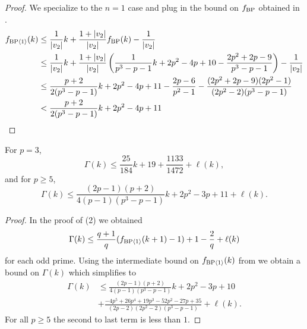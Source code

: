 \begin{proof}
  We specialize  to the $n=1$ case and plug in the bound on $f_{\mathrm{BP}}$ obtained in .
  \begin{align}\label{eqn:bp1}
    \nonumber f_{\textup{BP}\langle 1 \rangle}(k)
    &\leq \frac{1}{|v_2|}k + \frac{1 + |v_2|}{|v_2|} f_{\mathrm{BP}}(k) - \frac{1}{|v_2|} \\
    \nonumber &\leq \frac{1}{|v_2|}k + \frac{1 + |v_2|}{|v_2|} \left( \frac{1}{p^3 - p -1}k + 2p^2 - 4p + 10 - \frac{2p^2+2p-9}{p^3 - p -1} \right) - \frac{1}{|v_2|} \\
      &\leq \frac{p+2}{2(p^3 - p -1)}k + 2p^2 - 4p + 11 - \frac{2p - 6}{p^2 -1} - \frac{(2p^2+2p-9)(2p^2 -1)}{(2p^2 -2)(p^3 - p -1)} \\
    &< \frac{p+2}{2(p^3 - p -1)}k + 2p^2 - 4p + 11
  \end{align}
\end{proof}

\begin{cor}
  For $p=3$,
  $$ \Gamma(k) \leq \frac{25}{184}k + 19 + \frac{1133}{1472} + \ell(k), $$
  and for $p \geq 5$,
  $$ \Gamma(k) \leq \frac{(2p-1)(p+2)}{4(p-1)(p^3 - p -1)}k + 2p^2 - 3p + 11 + \ell(k). $$
\end{cor}

\begin{proof}
  In the proof of (2) we obtained
  $$ \Gamma(k) \leq \frac{q+1}{q} (f_{\mathrm{BP}\langle 1 \rangle}(k+1) - 1) + 1 - \frac{2}{q} + \ell(k) $$
  for each odd prime. Using the intermediate bound on $f_{\mathrm{BP}\langle 1 \rangle}(k)$ from  we obtain a bound on $\Gamma(k)$ which simplifies to
\begin{align*}
  \Gamma(k)
    &\leq \frac{(2p-1)(p+2)}{4(p-1)(p^3 - p -1)}k + 2p^2 - 3p + 10 \\ &+ \frac{-4p^5 + 26p^4 + 19p^3 - 52p^2 - 27p + 35}{(2p-2)(2p^2 - 2)(p^3 - p -1)} + \ell(k).
\end{align*}
For all $p \geq 5$ the second to last term is less than $1$.
\end{proof}

